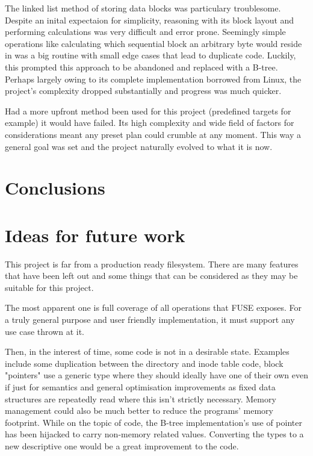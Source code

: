         The linked list method of storing data blocks was particulary
        troublesome. Despite an inital expectaion for simplicity, reasoning
        with its block layout and performing calculations was very difficult
        and error prone. Seemingly simple operations like calculating which
        sequential block an arbitrary byte would reside in was a big routine
        with small edge cases that lead to duplicate code. Luckily, this
        prompted this approach to be abandoned and replaced with a B-tree.
        Perhaps largely owing to its complete implementation borrowed from
        Linux, the project's complexity dropped substantially and progress was
        much quicker.

        Had a more upfront method been used for this project (predefined
        targets for example) it would have failed. Its high complexity and wide
        field of factors for considerations meant any preset plan could crumble
        at any moment. This way a general goal was set and the project
        naturally evolved to what it is now.

    \section{Conclusions}

    \section{Ideas for future work}

        This project is far from a production ready filesystem. There are many
        features that have been left out and some things that can be considered
        as they may be suitable for this project.

        The most apparent one is full coverage of all operations that FUSE
        exposes. For a truly general purpose and user friendly implementation,
        it must support any use case thrown at it.

        Then, in the interest of time, some code is not in a desirable state.
        Examples include some duplication between the directory and inode table
        code, block "pointers" use a generic type where they should ideally
        have one of their own even if just for semantics and general
        optimisation improvements as fixed data structures are repeatedly read
        where this isn't strictly necessary. Memory management could also be
        much better to reduce the programs' memory footprint. While on the
        topic of code, the B-tree implementation's use of pointer has been
        hijacked to carry non-memory related values. Converting the types to a
        new descriptive one would be a great improvement to the code.

